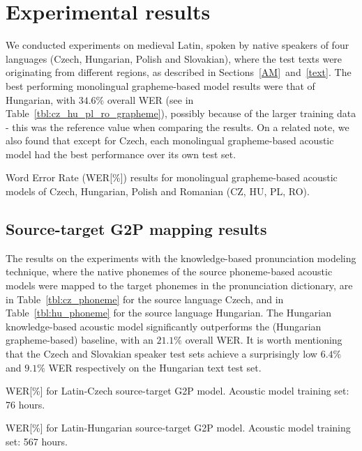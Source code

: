 \documentclass[runningheads,a4paper]{llncs}
\begin{document}
\section{Experimental results}\label{results}
We conducted experiments on medieval Latin, spoken by native speakers of four languages (Czech, Hungarian, Polish and Slovakian), where the test texts were originating from different regions, as described in Sections~\ref{AM}~and~\ref{text}.
The best performing monolingual grapheme-based model results were that of Hungarian, with $34.6\%$ overall WER (see in Table~\ref{tbl:cz_hu_pl_ro_grapheme}), possibly because of the larger training data - this was the reference value when comparing the results.
On a related note, we also found that except for Czech, each monolingual grapheme-based acoustic model had the best performance over its own test set.

\begin{table}
\centering
\caption{Word Error Rate (WER[\%]) results for monolingual grapheme-based acoustic models of Czech, Hungarian, Polish and Romanian (CZ, HU, PL, RO).}
\label{tbl:cz_hu_pl_ro_grapheme}
\end{table}

\subsection{Source-target G2P mapping results}
The results on the experiments with the knowledge-based pronunciation modeling technique, where the native phonemes of the source phoneme-based acoustic models were mapped to the target phonemes in the pronunciation dictionary, are in Table~\ref{tbl:cz_phoneme} for the source language Czech, and in Table~\ref{tbl:hu_phoneme} for the source language Hungarian.
The Hungarian knowledge-based acoustic model significantly outperforms the (Hungarian grapheme-based) baseline, with an $21.1\%$ overall WER.
It is worth mentioning that the Czech and Slovakian speaker test sets achieve a surprisingly low $6.4\%$ and $9.1\%$ WER respectively on the Hungarian text test set.

\begin{table}
\parbox{.45\linewidth}{
\centering
\caption{WER[\%] for Latin-Czech source-target G2P model. Acoustic model training set: 76 hours.}
\label{tbl:cz_phoneme}
}
\hfill
\parbox{.45\linewidth}{
\centering
\caption{WER[\%] for Latin-Hungarian source-target G2P model. Acoustic model training set: 567 hours.}
\label{tbl:hu_phoneme}
}
\end{table}
\end{document}

